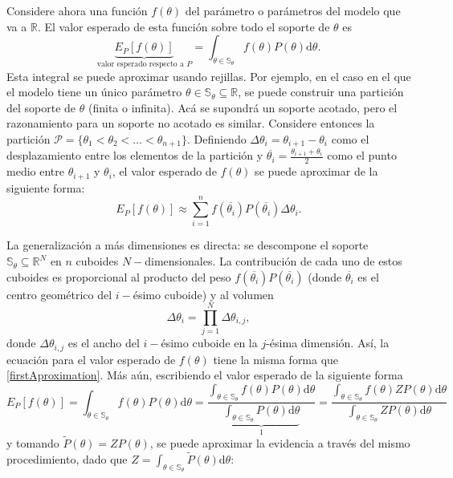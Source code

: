 		Considere ahora una función $f(\theta)$ del parámetro o parámetros del modelo que va a $\mathbb{R}$. El valor esperado de esta función sobre todo el soporte de $\theta$ es
		\begin{equation}
			\underbrace{E_P[f(\theta)]}_{\text{valor esperado respecto a }P}=\int_{\theta\in\mathbb{S}_\theta} f(\theta)P(\theta)\mathrm{d}\theta.
		\end{equation}
		Esta integral se puede aproximar usando rejillas. Por ejemplo, en el caso en el que el modelo tiene un único parámetro $\theta\in\mathbb{S}_\theta\subseteq\mathbb{R}$, se puede construir una partición del soporte de $\theta$ (finita o infinita). Acá se supondrá un soporte acotado, pero el razonamiento para un soporte no acotado es similar. Considere entonces la partición $\mathcal{P}=\{\theta_1<\theta_2<\dots<\theta_{n+1}\}$. Definiendo $\Delta\theta_i=\theta_{i+1}-\theta_i$ como el desplazamiento entre los elementos de la partición y $\overline{\theta_i}=\frac{\theta_{i+1}+\theta_i}{2}$ como el punto medio entre $\theta_{i+1}$ y $\theta_i$, el valor esperado de $f(\theta)$ se puede aproximar de la siguiente forma:
		\begin{equation}\label{firstAproximation}
			E_P[f(\theta)]\approx \sum_{i=1}^n f(\overline{\theta_i})P(\overline{\theta_i})\Delta \theta_i.
		\end{equation}
		
		La generalización a más dimensiones es directa: se descompone el soporte $\mathbb{S}_\theta\subseteq\mathbb{R}^N$ en $n$ cuboides $N-$dimensionales. La contribución de cada uno de estos cuboides es proporcional al producto del peso $f(\overline{\theta_i})P(\overline{\theta_i})$ (donde $\overline{\theta_i}$ es el centro geométrico del $i-$ésimo cuboide) y al volumen
		$$\Delta \theta_i=\prod_{j=1}^N \Delta \theta_{i,j},$$
		donde $\Delta\theta_{i,j}$ es el ancho del $i-$ésimo cuboide en la $j$-ésima dimensión. Así, la ecuación para el valor esperado de $f(\theta)$ tiene la misma forma que \eqref{firstAproximation}. Más aún, escribiendo el valor esperado de la siguiente forma
		$$E_P[f(\theta)]=\int_{\theta\in\mathbb{S}_\theta} f(\theta)P(\theta)\mathrm{d}\theta=\frac{\int_{\theta\in\mathbb{S}_\theta} f(\theta)P(\theta)\mathrm{d}\theta}{\underbrace{\int_{\theta\in\mathbb{S}_\theta} P(\theta)\mathrm{d}\theta}_{1}}=\frac{\int_{\theta\in\mathbb{S}_\theta} f(\theta)ZP(\theta)\mathrm{d}\theta}{\int_{\theta\in\mathbb{S}_\theta} ZP(\theta)\mathrm{d}\theta}$$
		y tomando $\tilde{P}(\theta)=ZP(\theta)$, se puede aproximar la evidencia a través del mismo procedimiento, dado que $Z=\int_{\theta\in\mathbb{S}_\theta}\tilde{P}(\theta)\mathrm{d}\theta$:
		
